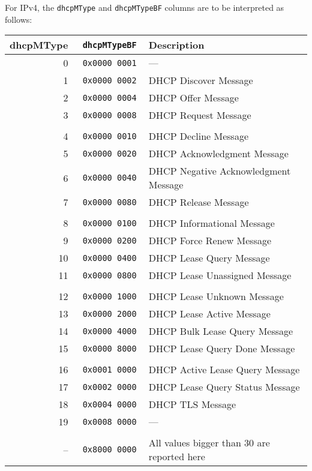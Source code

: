 \documentclass[documentation]{subfiles}
\begin{document}
For IPv4, the {\tt dhcpMType} and {\tt dhcpMTypeBF} columns are to be interpreted as follows:
\begin{longtable}{r>{\tt}rl}
    \toprule
    {\bf dhcpMType} & {\bf dhcpMTypeBF} & {\bf Description}\\
    \midrule\endhead%
    0  & 0x0000 0001 & ---\\
    1  & 0x0000 0002 & DHCP Discover Message\\
    2  & 0x0000 0004 & DHCP Offer Message\\
    3  & 0x0000 0008 & DHCP Request Message\\
    \\
    4  & 0x0000 0010 & DHCP Decline Message\\
    5  & 0x0000 0020 & DHCP Acknowledgment Message\\
    6  & 0x0000 0040 & DHCP Negative Acknowledgment Message\\
    7  & 0x0000 0080 & DHCP Release Message\\
    \\
    8  & 0x0000 0100 & DHCP Informational Message\\
    9  & 0x0000 0200 & DHCP Force Renew Message\\
    10 & 0x0000 0400 & DHCP Lease Query Message\\
    11 & 0x0000 0800 & DHCP Lease Unassigned Message\\
    \\
    12 & 0x0000 1000 & DHCP Lease Unknown Message\\
    13 & 0x0000 2000 & DHCP Lease Active Message\\
    14 & 0x0000 4000 & DHCP Bulk Lease Query Message\\
    15 & 0x0000 8000 & DHCP Lease Query Done Message\\
    \\
    16 & 0x0001 0000 & DHCP Active Lease Query Message\\
    17 & 0x0002 0000 & DHCP Lease Query Status Message\\
    18 & 0x0004 0000 & DHCP TLS Message\\
    19 & 0x0008 0000 & ---\\
    \\
    -- & 0x8000 0000 & All values bigger than 30 are reported here\\
    \bottomrule
\end{longtable}
\end{document}
